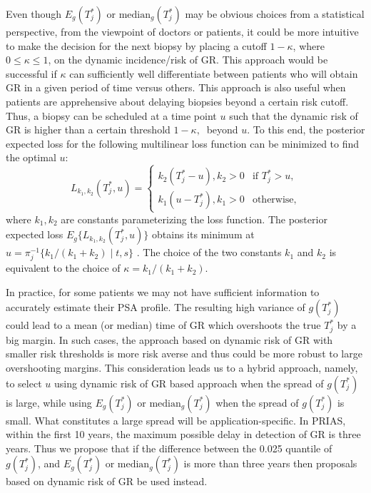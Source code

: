Even though $E_g(T^*_j)$ or $\mbox{median}_g(T^*_j)$ may be obvious choices from a statistical perspective, from the viewpoint of doctors or patients, it could be more intuitive to make the decision for the next biopsy by placing a cutoff $1 - \kappa$, where $0 \leq \kappa \leq 1$, on the dynamic incidence/risk of GR. This approach would be successful if $\kappa$ can sufficiently well differentiate between patients who will obtain GR in a given period of time versus others. This approach is also useful when patients are apprehensive about delaying biopsies beyond a certain risk cutoff. Thus, a biopsy can be scheduled at a time point $u$ such that the dynamic risk of GR is higher than a certain threshold $1 - \kappa,\ $ beyond $u$. To this end, the posterior expected loss for the following multilinear loss function can be minimized to find the optimal $u$:
\begin{equation*}
\label{eq : loss_dynamic_risk}
L_{k_1, k_2}(T^*_j, u) =
    \begin{cases}
      k_2(T^*_j-u), k_2>0 & \text{if } T^*_j > u,\\
      k_1(u-T^*_j), k_1>0 & \text{otherwise},
    \end{cases}       
\end{equation*}
where $k_1, k_2$ are constants parameterizing the loss function. The posterior expected loss $E_g\big\{L_{k_1, k_2}(T^*_j, u)\big\}$ obtains its minimum at $u = \pi_j^{-1}\big\{k_1/{(k_1 + k_2)} \mid t,s \big\}$ \citep{robertBayesianChoice}. The choice of the two constants $k_1$ and $k_2$ is equivalent to the choice of $\kappa = {k_1}/{(k_1 + k_2)}$.

In practice, for some patients we may not have sufficient information to accurately estimate their PSA profile. The resulting high variance of $g(T^*_j)$ could lead to a mean (or median) time of GR which overshoots the true $T_j^*$ by a big margin. In such cases, the approach based on dynamic risk of GR with smaller risk thresholds is more risk averse and thus could be more robust to large overshooting margins. This consideration leads us to a hybrid approach, namely, to select $u$ using dynamic risk of GR based approach when the spread of $g(T_j^*)$ is large, while using $E_g(T^*_j)$ or $\mbox{median}_g(T^*_j)$ when the spread of $g(T_j^*)$ is small. What constitutes a large spread will be application-specific. In PRIAS, within the first 10 years, the maximum possible delay in detection of GR is three years. Thus we propose that if the difference between the 0.025 quantile of $g(T^*_j)$, and $E_g(T^*_j)$ or $\mbox{median}_g(T^*_j)$ is more than three years then proposals based on dynamic risk of GR be used instead.